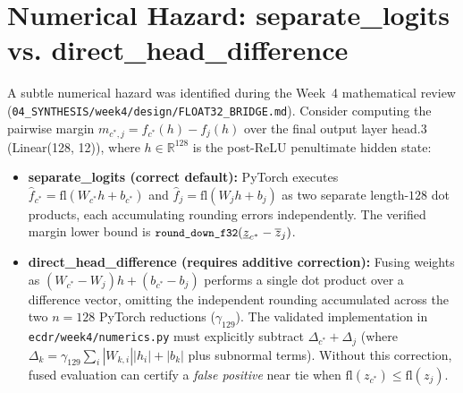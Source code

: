 \documentclass[11pt,oneside,a4paper]{report}
\newcommand{\R}{\mathbb{R}}
\newcommand{\code}[1]{{\small\upshape\ttfamily #1}}
\newcommand{\pathcode}[1]{{\small\upshape\ttfamily\nolinkurl{#1}}}
\theoremstyle{remark}
\begin{document}
\section{Numerical Hazard: \code{separate\_logits} \textup{vs.} \code{direct\_head\_difference}}
A subtle numerical hazard was identified during the Week~4 mathematical review (\pathcode{04_SYNTHESIS/week4/design/FLOAT32_BRIDGE.md}). Consider computing the pairwise margin $m_{c^*,j} = f_{c^*}(h) - f_j(h)$ over the final output layer \code{head.3} (\code{Linear(128, 12)}), where $h \in \R^{128}$ is the post-\code{ReLU} penultimate hidden state:
\begin{itemize}[leftmargin=1.5em]
  \item \textbf{\code{separate\_logits} (correct default):} PyTorch executes $\hat{f}_{c^*} = \mathrm{fl}(W_{c^*} h + b_{c^*})$ and $\hat{f}_j = \mathrm{fl}(W_j h + b_j)$ as two separate length-$128$ dot products, each accumulating rounding errors independently. The verified margin lower bound is $\text{\code{round\_down\_f32}}(\underline{z}_{c^*} - \overline{z}_j)$.
  \item \textbf{\code{direct\_head\_difference} (requires additive correction):} Fusing weights as $(W_{c^*} - W_j)h + (b_{c^*} - b_j)$ performs a single dot product over a difference vector, omitting the independent rounding accumulated across the two $n=128$ PyTorch reductions ($\gamma_{129}$). The validated implementation in \pathcode{ecdr/week4/numerics.py} must explicitly subtract $\Delta_{c^*} + \Delta_j$ (where $\Delta_k = \gamma_{129}\sum_i |W_{k,i}||h_i| + |b_k|$ plus subnormal terms). Without this correction, fused evaluation can certify a \emph{false positive} near tie when $\mathrm{fl}(z_{c^*}) \le \mathrm{fl}(z_j)$.
\end{itemize}
\end{document}
